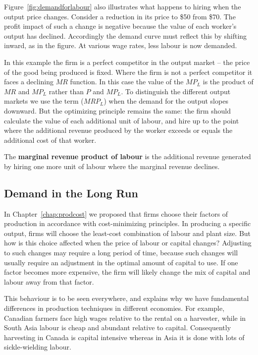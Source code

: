 

Figure~\ref{fig:demandforlabour} also illustrates what happens to hiring when the output price changes. Consider a reduction in its price to \$50 from \$70. The profit impact of such a change is negative because the value of each worker's output has declined. Accordingly the demand curve must reflect this by shifting inward, as in the figure. At various wage rates, less labour is now demanded.

In this example the firm is a perfect competitor in the output market -- the price of the good being produced is fixed. Where the firm is not a perfect competitor it faces a declining $MR$ function. In this case the value of the $MP_L$ is the product of $MR$ and $MP_L$ rather than $P$ and $MP_L$. To distinguish the different output markets we use the term  ($MRP_L$) when the demand for the output slopes downward. But the optimizing principle remains the same: the firm should calculate the value of each additional unit of labour, and hire up to the point where the additional revenue produced by the worker exceeds or equals the additional cost of that worker.

\begin{DefBox}
The \textbf{marginal revenue product of labour} is the additional revenue generated by hiring one more unit of labour where the marginal revenue declines.
\end{DefBox}
 
\subsection*{Demand in the Long Run}

In Chapter~\ref{chap:prodcost} we proposed that firms choose their factors of production in accordance with cost-minimizing principles. In producing a specific output, firms will choose the least-cost combination of labour and plant size. But how is this choice affected when the price of labour or capital changes? Adjusting to such changes may require a long period of time, because such changes will usually require an adjustment in the optimal amount of capital to use. If one factor becomes more expensive, the firm will likely change the mix of capital and labour away from that factor.

This behaviour is to be seen everywhere, and explains why we have fundamental differences in production techniques in different economies. For example, Canadian farmers face high wages relative to the rental on a harvester, while in South Asia labour is cheap and abundant relative to capital. Consequently harvesting in Canada is capital intensive whereas in Asia it is done with lots of sickle-wielding labour.

